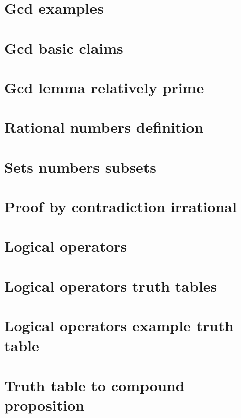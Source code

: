 \section*{Gcd examples}

\vfill
\section*{Gcd basic claims}

\vfill
\section*{Gcd lemma relatively prime}

\vfill
\section*{Rational numbers definition}

\vfill
\section*{Sets numbers subsets}

\vfill
\section*{Proof by contradiction irrational}

\vfill
\section*{Logical operators}

\vfill
\section*{Logical operators truth tables}

\vfill
\section*{Logical operators example truth table}

\vfill
\section*{Truth table to compound proposition}

\vfill
